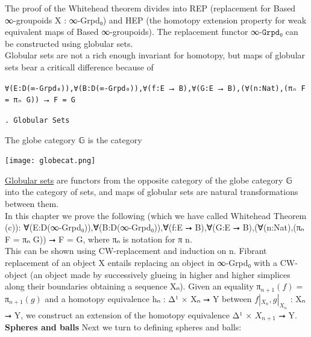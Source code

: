 \documentclass{book}
\theoremstyle{definition}
\newcounter{pcounter}
\newcounter{sectioncount}
\newcounter{subsectioncount}
\renewcommand{\subsection}[1]{\texttt{\thesubsectioncount . #1} \stepcounter{subsectioncount}}
\begin{document}
The proof of the Whitehead theorem divides into REP (replacement for Based ∞-groupoids X : ∞-Grpd₀) and HEP (the homotopy extension property for weak equivalent maps of Based ∞-groupoids). The replacement functor ∞$\texttt{-Grpd}$₀ can be constructed using globular sets.\\

Globular sets are not a rich enough invariant for homotopy, but maps of globular sets bear a criticall difference because of 

\begin{center}
\texttt{∀(E:D(∞-Grpd₀)),∀(B:D(∞-Grpd₀)),∀(f:E ⭢ B),∀(G:E ⭢ B),(∀(n:Nat),(πₙ F = πₙ G)) ⭢ F = G}
\end{center}

\subsection{Globular Sets}

The globe category 𝔾 is the category

\begin{center}
\texttt{[image: globecat.png]}
\end{center}

\href{https://ncatlab.org/nlab/show/globular+set}{Globular sets} are functors from the opposite category of the globe category 𝔾 into the category of sets, and maps of globular sets are natural transformations between them.\\

In this chapter we prove the following (which we have called Whitehead Theorem (c)): ∀(E:D(∞-Grpd₀)),∀(B:D(∞-Grpd₀)),∀(f:E ⭢ B),∀(G:E ⭢ B),(∀(n:Nat),(πₙ F = πₙ G)) ⭢ F = G, where πₙ is notation for π n.\\

This can be shown using CW-replacement and induction on n. Fibrant replacement of an object X entails replacing an object in ∞-Grpd₀ with a CW-object (an object made by successively glueing in higher and higher simplices along their boundaries obtaining a sequence Xₙ). Given an equality π${}_{n+1}(f) = $π${}_{n+1}(g)$ and a homotopy equivalence hₙ : Δ¹ × Xₙ ⭢ Y between $f|_{X_n}, g|_{X_n}$ : Xₙ ⭢ Y, we construct an extension of the homotopy equivalence Δ¹ × $X_{n+1}$ ⭢ Y.\\

{\bf Spheres and balls} Next we turn to defining spheres and balls:
\end{document}
